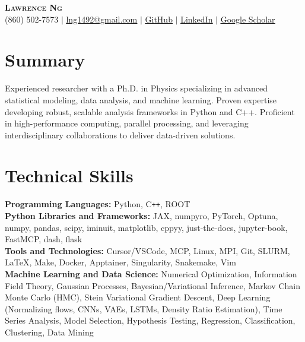 \documentclass[letterpaper,11pt]{article}
\begin{document}
\begin{center}
    \textbf{\Huge \scshape Lawrence Ng} \\ \vspace{1pt}
    \small (860) 502-7573 $|$ \href{mailto:lng1492@gmail.com}{\underline{lng1492@gmail.com}} $|$
    \href{https://github.com/lan13005}{\underline{GitHub}} $|$
    \href{https://linkedin.com/in/lawrence-ng-070050157}{\underline{LinkedIn}} $|$
    \href{https://scholar.google.com/citations?user=fiWazGQAAAAJ&hl=en}{\underline{Google Scholar}}
\end{center}

\section{Summary}
Experienced researcher with a Ph.D. in Physics specializing in advanced statistical modeling, data analysis, and machine learning. Proven expertise developing robust, scalable analysis frameworks in Python and C++. Proficient in high-performance computing, parallel processing, and leveraging interdisciplinary collaborations to deliver data-driven solutions.

\section{Technical Skills}
\begin{itemize}[leftmargin=0.15in, label={}]
  \small{\item{
    \textbf{Programming Languages:} Python, C\texttt{++}, ROOT \\
    \textbf{Python Libraries and Frameworks:} JAX, numpyro, PyTorch, Optuna, numpy, pandas, scipy, iminuit, matplotlib, cppyy, just-the-docs, jupyter-book, FastMCP, dash, flask \\
    \textbf{Tools and Technologies:} Cursor/VSCode, MCP, Linux, MPI, Git, SLURM, LaTeX, Make, Docker, Apptainer, Singularity, Snakemake, Vim \\
    \textbf{Machine Learning and Data Science:} Numerical Optimization, Information Field Theory, Gaussian Processes, Bayesian/Variational Inference, Markov Chain Monte Carlo (HMC), Stein Variational Gradient Descent, Deep Learning (Normalizing flows, CNNs, VAEs, LSTMs, Density Ratio Estimation), Time Series Analysis, Model Selection, Hypothesis Testing, Regression, Classification, Clustering, Data Mining
  }}
\end{itemize}
\end{document}
